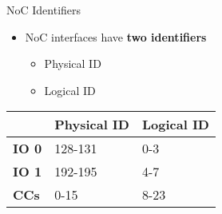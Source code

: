 		\begin{frame}[fragile]{NoC Identifiers}
			\begin{itemize}
				\item NoC interfaces have \textbf{two identifiers}
				\begin{itemize}
					\item Physical ID
					\item Logical ID
				\end{itemize}
			\end{itemize}

			\begin{table}
				\centering%
				\begin{tabular}{l|l|l|}
					\cline{2-3}
											            & \textbf{Physical ID} & \textbf{Logical ID} \\ \hline
					\multicolumn{1}{|l|}{\textbf{IO 0}} & 128-131              & 0-3                 \\ \hline
					\multicolumn{1}{|l|}{\textbf{IO 1}} & 192-195              & 4-7                 \\ \hline
					\multicolumn{1}{|l|}{\textbf{CCs}}  & 0-15                 & 8-23                \\ \hline
				\end{tabular}
			\end{table}

		\end{frame}

